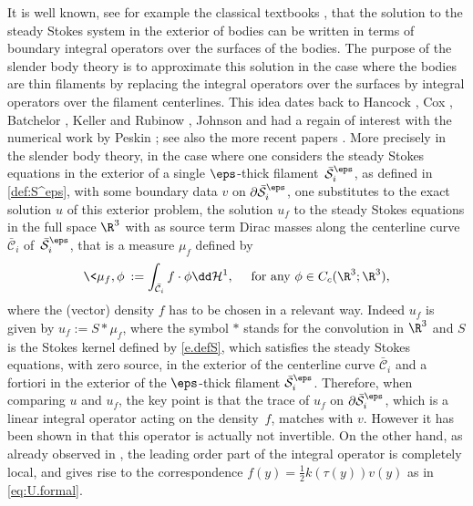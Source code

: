 It is well known, see for example the classical textbooks \cite{HW,Pozrikidis},
that the solution to the steady Stokes system in the exterior of bodies can be written in terms of boundary integral operators over the surfaces of the bodies.
The purpose of the slender body theory is to approximate this solution in the case where the bodies are
thin filaments by replacing the integral operators over the surfaces by integral operators over the filament centerlines.
This idea dates back to Hancock \cite{Hancock}, Cox \cite{Cox}, Batchelor \cite{Batchelor}, Keller and Rubinow \cite{KR}, Johnson \cite{Johnson} and had a regain of interest with the {numerical} work by Peskin \cite{Peskin}; see also the more recent papers \cite{Ohm-numerics, Tornberg}.
More precisely in the slender body theory, in the case where one considers the steady Stokes equations in the exterior of a single $\eps$-thick filament~${\bar{ \mathcal S}_i^\eps}$, as defined in
\eqref{def:S^eps}, with some boundary data $v$ on $ \partial {\bar{ \mathcal S}_i^\eps}$, one substitutes to the exact solution $u$ of this exterior problem, the solution $u_f$ to the steady Stokes equations in the full space $\R^3$ with as source term Dirac masses along the centerline curve $\bar{\mathcal{C}}_i$ of~${\bar{ \mathcal S}_i^\eps}$, that is a measure $ \mu_{f}$ defined by
\begin{equation} \label{def:muf}
\< \mu_{f}, \phi \> := \int_{\bar{\mathcal{C}}_i} f \cdot \phi \dd \mathcal{H}^1, \quad \text{ for any } \phi \in C_c (\R^3 ; \R^3),
\end{equation}
where the (vector) density $f$ has to be chosen in a relevant way. Indeed $u_f$ is given by $u_f := S \ast \mu_{f} $, where the symbol $\ast$ stands for the convolution in $\R^3$ and $S$ is the Stokes kernel defined by \eqref{e.defS}, which satisfies the steady Stokes equations, with zero source, in the exterior of the centerline curve $\bar{\mathcal{C}}_i$ and a fortiori in the exterior of
the $\eps$-thick filament ${\bar{ \mathcal S}_i^\eps}$. Therefore, when comparing $u$ and $u_f$, the key point is that the trace of $u_{f} $ on $ \partial {\bar{ \mathcal S}_i^\eps}$, which is a linear integral operator acting on the density~$f$, matches with $v$.
However it has been shown in \cite{Goetz} that this operator is actually not invertible.
On the other hand, as already observed in \cite{Cox}, the leading order part of the integral operator is completely local, and gives rise to the correspondence $ f(y) = \frac12 k(\tau(y)) v(y)$ as in \eqref{eq:U.formal}.
